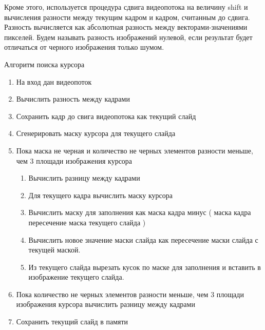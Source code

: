 \documentclass[oneside,final,14pt]{extreport}
\begin{document}
Кроме этого, используется процедура сдвига  видеопотока на величину shift и вычисления разности между текущим кадром и кадром, считанным до сдвига.
Разность вычисляется как абсолютная разность между векторами-значениями пикселей. Будем называть разность изображений нулевой, если результат будет отличаться от черного изображения только шумом.

Алгоритм поиска курсора

\begin{enumerate}
\item На вход дан видеопоток
\item Вычислить  разность между кадрами
\item Сохранить кадр до свига видеопотока как текущий слайд
\item Сгенерировать маску курсора для текущего слайда
\item Пока маска не черная и количество не черных элементов разности меньше, чем 3 площади изображения курсора
\begin{enumerate}
	\item Вычислить разницу между кадрами
	\item Для текущего кадра вычислить маску курсора
	\item Вычислить маску для заполнения как маска кадра минус ( маска кадра пересечение маска текущего слайда )
	\item Вычислить новое значение маски слайда как пересечение маски слайда с текущей маской.
	\item Из текущего слайда вырезать кусок по маске для заполнения и вставить в изображение текущего слайда.
\end{enumerate}
\item Пока количество не черных элементов разности меньше, чем 3 площади изображения курсора вычислить разницу между кадрами
\item Сохранить текущий слайд в памяти
\end{enumerate}
\end{document}
